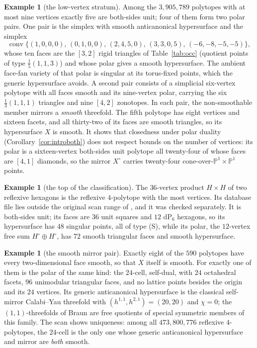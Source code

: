 \documentclass[11pt]{amsart}
\theoremstyle{definition}
\newtheorem{example}[theorem]{Example}
\theoremstyle{remark}
\newcommand{\PP}{\mathbb{P}}
\newcommand{\conv}{\operatorname{conv}}
\begin{document}
\begin{example}[the low-vertex stratum]\label{ex:pair}
Among the $3{,}905{,}789$ polytopes with at most nine vertices exactly five
are both-sides unit; four of them form two polar pairs.  One pair is the
simplex with smooth anticanonical hypersurface and the simplex
\[
\conv\{(1,0,0,0),\,(0,1,0,0),\,(2,4,5,0),\,(3,3,0,5),\,(-6,-8,-5,-5)\},
\]
whose ten
faces are the $[3,2]$ rigid triangles of Table~\ref{tab:occ} (quotient
points of type $\frac15(1,1,3)$) and whose polar gives a smooth
hypersurface.  The ambient face-fan variety of that polar is singular
at its torus-fixed points, which the generic hypersurface avoids.  A second pair consists of a
simplicial six-vertex polytope with all faces smooth and its nine-vertex
polar, carrying the six $\frac13(1,1,1)$ triangles and nine $[4,2]$
zonotopes.  In each pair, the non-smoothable member mirrors a \emph{smooth}
threefold.  The fifth polytope has eight vertices and sixteen facets, and
all thirty-two of its faces are smooth triangles, so its hypersurface $X$
is smooth.  It shows that closedness under polar duality
(Corollary~\ref{cor:introboth}) does not respect bounds on the number of
vertices: its
polar is a sixteen-vertex both-sides unit polytope all twenty-four of whose
faces are $[4,1]$ diamonds, so the mirror $X^\circ$ carries twenty-four
cone-over-$\PP^1{\times}\PP^1$ points.
\end{example}

\begin{example}[the top of the classification]\label{ex:pair36}
The $36$-vertex product $H \times H$ of two reflexive hexagons is the
reflexive $4$-polytope with the most vertices.  Its database file lies
outside the original scan range of \cite{paper1}, and it was checked
separately.  It is
both-sides unit; its faces are $36$ unit squares and $12$ $\mathrm{dP}_6$
hexagons, so its hypersurface has $48$ singular points, all of type
\textup{(S)}, while its polar, the $12$-vertex free sum
$H^\circ \oplus H^\circ$, has $72$ smooth triangular faces and smooth
hypersurface.
\end{example}

\begin{example}[the smooth mirror pair]\label{ex:24cell}
Exactly eight of the $590$ polytopes have every two-dimensional face
smooth, so that $X$ itself is smooth.  For exactly one of them is the polar
of the same kind: the $24$-cell, self-dual, with $24$ octahedral facets,
$96$ unimodular triangular faces, and no lattice points besides the origin
and its $24$ vertices.  Its generic anticanonical hypersurface is the
classical self-mirror Calabi--Yau threefold with
$(h^{1,1},h^{2,1}) = (20,20)$ and $\chi = 0$; the $(1,1)$-threefolds of
Braun \cite{Braun12} are free quotients of special symmetric members of
this family.  The scan shows uniqueness:
among all $473{,}800{,}776$ reflexive $4$-polytopes, the $24$-cell is the
only one whose generic anticanonical hypersurface and mirror are
\emph{both} smooth.
\end{example}
\end{document}
